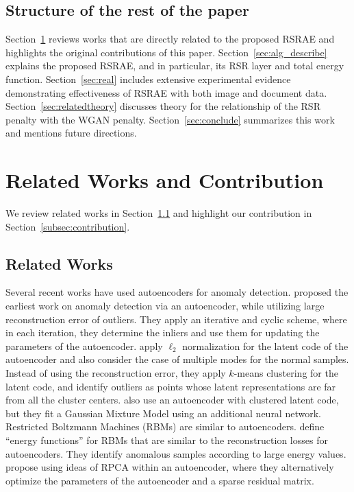 \documentclass{article} \usepackage{iclr2020_conference,times}
\def\Secref#1{Section~\ref{#1}}
\begin{document}
\subsection{Structure of the rest of the paper}
\Secref{sec:relatedwork} reviews works that are directly related to the proposed RSRAE and highlights the original contributions of this paper. \Secref{sec:alg_describe} explains the proposed RSRAE, and in particular, its RSR layer and total energy function. \Secref{sec:real} includes extensive experimental evidence demonstrating  effectiveness of RSRAE with both image and document data. 
\Secref{sec:relatedtheory} discusses theory for the relationship of the RSR penalty with the WGAN penalty.
\Secref{sec:conclude} summarizes this work and mentions future directions. 

\section{Related Works and Contribution}\label{sec:relatedwork}

We review related works in \Secref{subsec:relatedworks} and highlight our contribution in \Secref{subsec:contribution}.

\subsection{Related Works}\label{subsec:relatedworks}
Several recent works have used autoencoders for anomaly detection. 
\citet{xia2015learning} proposed the earliest work on anomaly detection via an autoencoder, while utilizing large reconstruction error of outliers. They apply an iterative and cyclic scheme, where in each iteration, they determine the inliers and use them for updating the parameters of the autoencoder. \citet{aytekin2018clustering} apply $\ell_{2}$ normalization for the latent code of the autoencoder and also consider the case of multiple modes for the normal samples. Instead of using the reconstruction error, they apply $k$-means clustering for the latent code, and identify outliers as points whose latent representations are far from all the cluster centers. \citet{zong2018deep} also use an autoencoder with clustered latent code, but they fit a Gaussian Mixture Model using an additional neural network.
Restricted Boltzmann Machines (RBMs) are similar to autoencoders. \citet{zhai2016deep} define ``energy functions'' for RBMs that are similar to the reconstruction losses for autoencoders. They identify anomalous samples according to large energy values. \citet{chalapathy2017robust} propose using ideas of RPCA within an autoencoder, where they alternatively optimize the parameters of the autoencoder and a sparse residual matrix.
\end{document}
